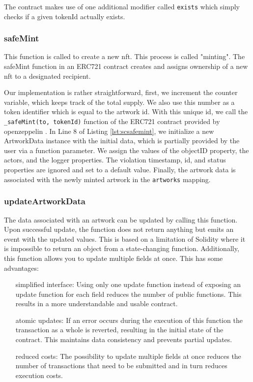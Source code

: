 The contract makes use of one additional modifier called \texttt{exists} which simply checks if a given tokenId actually exists.

\subsubsection{safeMint}
This function is called to create a new \gls{nft}. This process is called "minting". The safeMint function in an ERC721 contract creates and assigns ownership of a new \gls{nft} to a designated recipient. 



Our implementation is rather straightforward, first, we increment the counter variable, which keeps track of the total supply. We also use this number as a token identifier which is equal to the artwork \gls{id}. With this unique \gls{id}, we call the \texttt{\_safeMint(to, tokenId)} function of the ERC721 contract provided by openzeppelin \cite{openzeppelin}. In Line 8 of Listing \ref{lst:scsafemint}, we initialize a new ArtworkData instance with the initial data, which is partially provided by the user via a function parameter. We assign the values of the objectID property, the actors, and the logger properties. The violation timestamp, \gls{id}, and status properties are ignored and set to a default value. Finally, the artwork data is associated with the newly minted artwork in the \texttt{artworks} mapping.

\subsubsection{updateArtworkData}
The data associated with an artwork can be updated by calling this function. Upon successful update, the function does not return anything but emits an event with the updated values. This is based on a limitation of Solidity where it is impossible to return an object from a state-changing function. Additionally, this function allows you to update multiple fields at once. This has some advantages:

\begin{itemize}[align=left, font=\itshape]
    \item[simplified interface:] Using only one update function instead of exposing an update function for each field reduces the number of public functions. This results in a more understandable and usable contract.
    \item[atomic updates:] If an error occurs during the execution of this function the transaction as a whole is reverted, resulting in the initial state of the contract. This maintains data consistency and prevents partial updates.
    \item[reduced costs:] The possibility to update multiple fields at once reduces the number of transactions that need to be submitted and in turn reduces execution costs.
\end{itemize}

